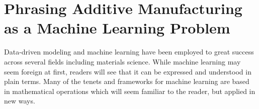\section{Phrasing Additive Manufacturing as a Machine Learning Problem}\label{phrasing}
Data-driven modeling and machine learning have been employed to great success across several fields including materials science. While machine learning may seem foreign at first, readers will see that it can be expressed and understood in plain terms. Many of the tenets and frameworks for machine learning are based in mathematical operations which will seem familiar to the reader, but applied in new ways. 








